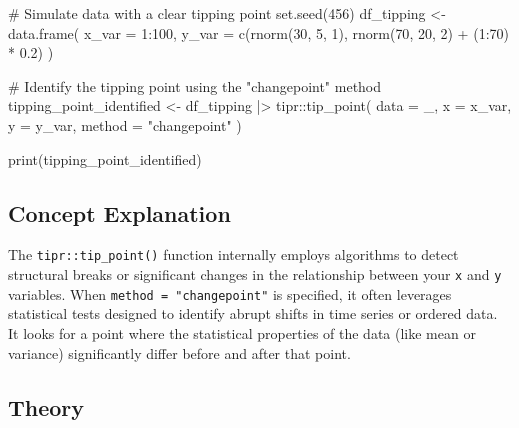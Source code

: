 \documentclass[
  10pt,
  letterpaper,
  DIV=11,
  numbers=noendperiod]{scrartcl}
\newenvironment{Shaded}{\begin{snugshade}}{\end{snugshade}}
\newcommand{\AttributeTok}[1]{\textcolor[rgb]{0.40,0.45,0.13}{#1}}
\newcommand{\CommentTok}[1]{\textcolor[rgb]{0.37,0.37,0.37}{#1}}
\newcommand{\DecValTok}[1]{\textcolor[rgb]{0.68,0.00,0.00}{#1}}
\newcommand{\FloatTok}[1]{\textcolor[rgb]{0.68,0.00,0.00}{#1}}
\newcommand{\FunctionTok}[1]{\textcolor[rgb]{0.28,0.35,0.67}{#1}}
\newcommand{\NormalTok}[1]{\textcolor[rgb]{0.00,0.23,0.31}{#1}}
\newcommand{\OtherTok}[1]{\textcolor[rgb]{0.00,0.23,0.31}{#1}}
\newcommand{\SpecialCharTok}[1]{\textcolor[rgb]{0.37,0.37,0.37}{#1}}
\newcommand{\StringTok}[1]{\textcolor[rgb]{0.13,0.47,0.30}{#1}}
\begin{document}
\begin{Shaded}
\begin{Highlighting}[]
\CommentTok{\# Simulate data with a clear tipping point}
\FunctionTok{set.seed}\NormalTok{(}\DecValTok{456}\NormalTok{)}
\NormalTok{df\_tipping }\OtherTok{\textless{}{-}} \FunctionTok{data.frame}\NormalTok{(}
  \AttributeTok{x\_var =} \DecValTok{1}\SpecialCharTok{:}\DecValTok{100}\NormalTok{,}
  \AttributeTok{y\_var =} \FunctionTok{c}\NormalTok{(}\FunctionTok{rnorm}\NormalTok{(}\DecValTok{30}\NormalTok{, }\DecValTok{5}\NormalTok{, }\DecValTok{1}\NormalTok{), }\FunctionTok{rnorm}\NormalTok{(}\DecValTok{70}\NormalTok{, }\DecValTok{20}\NormalTok{, }\DecValTok{2}\NormalTok{) }\SpecialCharTok{+}\NormalTok{ (}\DecValTok{1}\SpecialCharTok{:}\DecValTok{70}\NormalTok{) }\SpecialCharTok{*} \FloatTok{0.2}\NormalTok{)}
\NormalTok{)}

\CommentTok{\# Identify the tipping point using the "changepoint" method}
\NormalTok{tipping\_point\_identified }\OtherTok{\textless{}{-}}\NormalTok{ df\_tipping }\SpecialCharTok{|\textgreater{}}
\NormalTok{  tipr}\SpecialCharTok{::}\FunctionTok{tip\_point}\NormalTok{(}
    \AttributeTok{data =}\NormalTok{ \_,}
    \AttributeTok{x =}\NormalTok{ x\_var,}
    \AttributeTok{y =}\NormalTok{ y\_var,}
    \AttributeTok{method =} \StringTok{"changepoint"}
\NormalTok{  )}

\FunctionTok{print}\NormalTok{(tipping\_point\_identified)}
\end{Highlighting}
\end{Shaded}

\subsection{Concept Explanation}\label{concept-explanation}

The \texttt{tipr::tip\_point()} function internally employs algorithms
to detect structural breaks or significant changes in the relationship
between your \texttt{x} and \texttt{y} variables. When
\texttt{method\ =\ "changepoint"} is specified, it often leverages
statistical tests designed to identify abrupt shifts in time series or
ordered data. It looks for a point where the statistical properties of
the data (like mean or variance) significantly differ before and after
that point.

\subsection{Theory}\label{theory}
\end{document}
